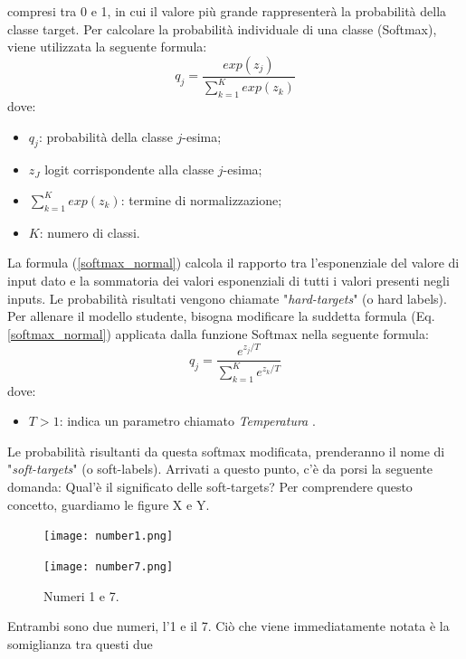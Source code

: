 compresi tra 0 e 1, in cui il valore più grande rappresenterà la probabilità 
della classe target. Per calcolare la probabilità individuale di una classe 
(Softmax), viene utilizzata la seguente formula:
\begin{equation}\label{softmax_normal}
    q_j = \frac{exp(z_j)}{\sum_{k=1}^K exp(z_k)}
\end{equation}
dove:
\begin{itemize}
    \item $q_j$: probabilità della classe $j$-esima;
    \item $z_J$ logit corrispondente alla classe $j$-esima;
    \item $\sum_{k=1}^K exp(z_k)$: termine di normalizzazione;
    \item $K$: numero di classi.
\end{itemize}
La formula (\ref{softmax_normal}) calcola il rapporto tra l'esponenziale del valore di input 
dato e la sommatoria dei valori esponenziali di tutti i valori presenti negli 
inputs. Le probabilità risultati vengono chiamate "\emph{hard-targets}" (o hard 
labels). Per allenare il modello studente, bisogna modificare la suddetta 
formula (Eq. \ref{softmax_normal}) applicata dalla funzione Softmax nella seguente formula:
\begin{equation}
    q_j = \frac{e^{z_j/T}}{\sum_{k=1}^K e^{z_k/T}}
\end{equation}
dove:
\begin{itemize}
    \item $T>1$: indica un parametro chiamato \emph{Temperatura} \cite{marino2021compact}.
\end{itemize}
Le probabilità risultanti da questa softmax modificata, prenderanno il nome 
di "\emph{soft-targets}" (o soft-labels). Arrivati a questo punto, c'è da porsi la 
seguente domanda: Qual'è il significato delle soft-targets? Per comprendere 
questo concetto, guardiamo le figure X e Y.
\begin{figure}[]
    \begin{minipage}[t]{.45\textwidth}
        \centering
        \texttt{[image: number1.png]}
    \end{minipage}
    \hfill
    \begin{minipage}[t]{.45\textwidth}
        \centering
        \texttt{[image: number7.png]}
    \end{minipage}  
    \caption{Numeri 1 e 7.}
    \label{numbers_Mnist}
\end{figure}
Entrambi sono due numeri, l'1 
e il 7. Ciò che viene immediatamente notata è la somiglianza tra questi due 
